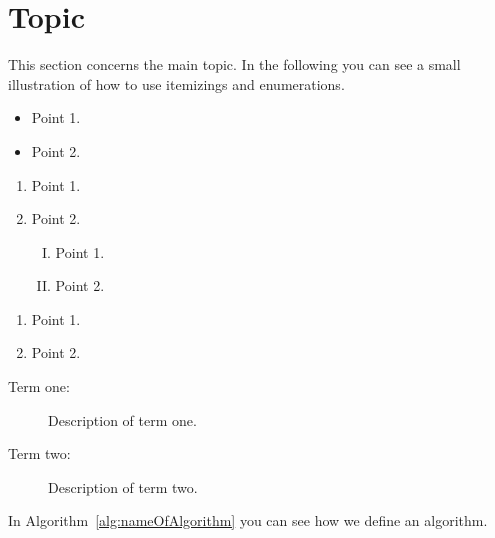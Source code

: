 \section{Topic}
\label{sec:topic}
This section concerns the main topic. In the following you can see a
small illustration of how to use itemizings and enumerations.

\begin{itemize}
	\item Point 1.
	\item Point 2.
\end{itemize}

\begin{enumerate}
	\item Point 1.
	\item Point 2.
	\begin{enumerate}[I)]
  \item Point 1.
  \item Point 2.
\end{enumerate}
\end{enumerate}

\begin{enumerate}
	\item Point 1.
	\item Point 2.
\end{enumerate}

\begin{description}
	\item[Term one: ] Description of term one.
	\item[Term two: ] Description of term two.
\end{description}

In Algorithm~\ref{alg:nameOfAlgorithm} you can see how we define an
algorithm.

